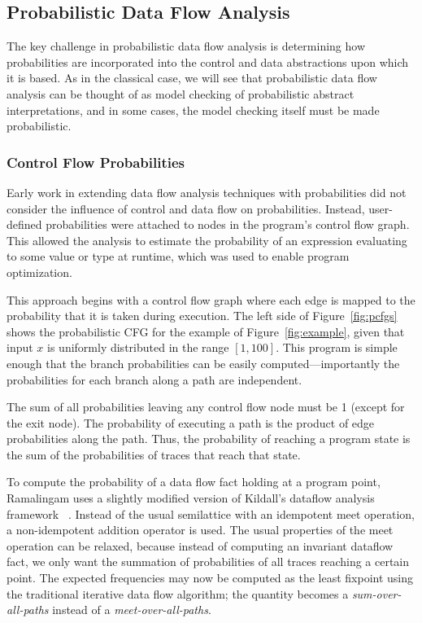 \subsection{Probabilistic Data Flow Analysis}
\label{sec:pdfa}

The key challenge in probabilistic data flow analysis is
determining how probabilities are incorporated into the control
and data abstractions upon which it is based.
As in the classical case, we will see that probabilistic data flow analysis
can be thought of as model checking
of probabilistic abstract interpretations, and in some
cases, the model checking itself must be made probabilistic.

\subsubsection{Control Flow Probabilities}
Early work in extending data flow analysis 
techniques with probabilities did not consider
the influence of control and data flow on probabilities.
Instead, user-defined probabilities 
were attached to nodes in the program's control flow graph.  
This allowed the analysis to estimate
the probability of an expression evaluating 
to some value or type at runtime, which was used to enable
program optimization.

This approach begins with a control flow graph where each edge is 
mapped to the probability that it is taken during execution.
The left side of Figure~\ref{fig:pcfgs} shows the probabilistic CFG for the
example of Figure~\ref{fig:example}, given that input $x$
is uniformly distributed in the range $[1,100]$.  
This program is simple enough that the branch probabilities can
be easily computed---importantly the probabilities for each
branch along a path are independent.

The sum of all probabilities leaving any control flow node must be 1
(except for the exit node).
The probability of executing a path is the product of 
edge probabilities along the path.
Thus, the probability of reaching a program state is the
sum of the probabilities of traces that reach that state.



To compute the probability of a data flow fact holding 
at a program point, Ramalingam uses a slightly
modified version of Kildall's dataflow analysis framework
~\cite{ramalingam1996data}.
Instead of the usual semilattice with an idempotent meet
operation, a non-idempotent addition operator is used.
The usual properties of the meet operation can be
relaxed, because instead of computing an invariant dataflow
fact, we only want the summation of probabilities of all
traces reaching a certain point.
The expected frequencies may now be computed as the least
fixpoint using the traditional iterative data flow algorithm;
the quantity becomes a
{\sl sum-over-all-paths} instead of a {\sl meet-over-all-paths}.

